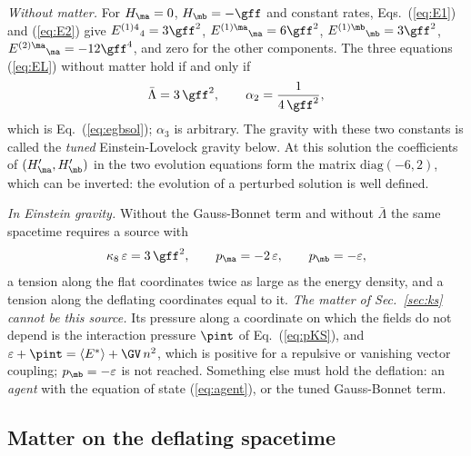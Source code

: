 \emph{Without matter.} For $H_{\ma}=0$, $H_{\mb}=-\gff$ and constant rates,
Eqs.~(\ref{eq:E1}) and (\ref{eq:E2}) give
$E^{(1)4}{}_{4}=3\gff^{2}$, $E^{(1)\ma}{}_{\ma}=6\gff^{2}$, $E^{(1)\mb}{}_{\mb}=3\gff^{2}$,
$E^{(2)\ma}{}_{\ma}=-12\gff^{4}$, and zero for the other components. The three equations
(\ref{eq:EL}) without matter hold if and only if
\begin{equation}
\bar\Lambda=3\,\gff^{2},\qquad\alpha_2=\frac{1}{4\,\gff^{2}},
\label{eq:tuned}
\end{equation}
which is Eq.~(\ref{eq:egbsol}); $\alpha_3$ is arbitrary. The gravity with these two constants is
called the \emph{tuned} Einstein-Lovelock gravity below. At this solution the coefficients of
$(H_{\ma}',H_{\mb}')$ in the two evolution equations form the matrix $\mathrm{diag}(-6,2)$, which
can be inverted: the evolution of a perturbed solution is well defined.

\emph{In Einstein gravity.} Without the Gauss-Bonnet term and without $\bar\Lambda$ the same
spacetime requires a source with
\begin{equation}
\kappa_8\,\varepsilon=3\,\gff^{2},\qquad p_{\ma}=-2\,\varepsilon,\qquad p_{\mb}=-\varepsilon ,
\label{eq:agent}
\end{equation}
a tension along the flat coordinates twice as large as the energy density, and a tension along the
deflating coordinates equal to it. \emph{The matter of Sec.~\ref{sec:ks} cannot be this source.} Its
pressure along a coordinate on which the fields do not depend is the interaction pressure $\pint$ of
Eq.~(\ref{eq:pKS}), and $\varepsilon+\pint=\langle E^{*}\rangle+\GV\,n^{2}$, which is positive for a
repulsive or vanishing vector coupling; $p_{\mb}=-\varepsilon$ is not reached. Something else must
hold the deflation: an \emph{agent} with the equation of state (\ref{eq:agent}), or the tuned
Gauss-Bonnet term.

\subsection{Matter on the deflating spacetime}

